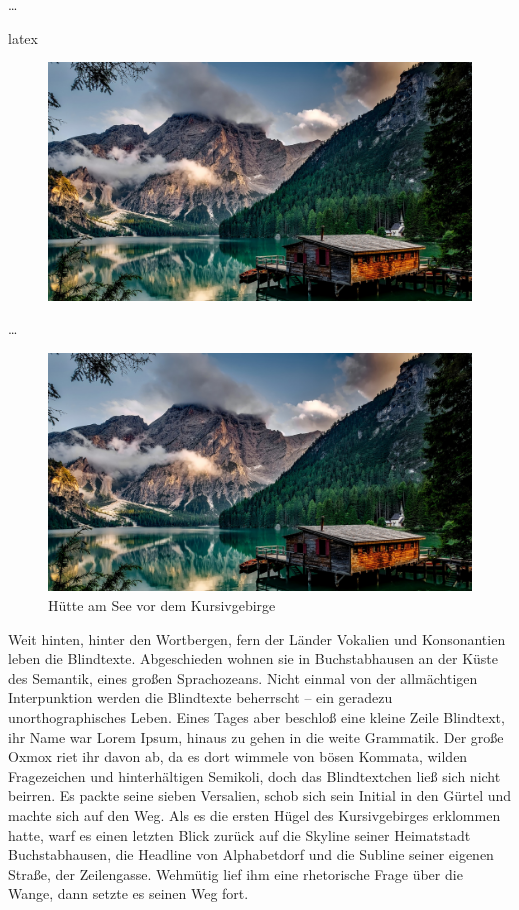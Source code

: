\begin{showcase}
    …
    \begin{code}{latex}
        \begin{figure}
            \centering
            \includegraphics[width=0.5\columnwidth]{assets/images/bilder/pexels-pixabay-147411.jpg}
        \end{figure}
    \end{code}
    …
    \tcblower
    \begin{figure}
        \centering
        \includegraphics[width=0.5\columnwidth]{assets/images/bilder/pexels-pixabay-147411.jpg}
        \caption{Hütte am See vor dem Kursivgebirge}
    \end{figure}
    Weit hinten, hinter den Wortbergen, fern der Länder Vokalien und Konsonantien leben die Blindtexte. Abgeschieden wohnen sie in Buchstabhausen an der Küste des Semantik, eines großen Sprachozeans. Nicht einmal von der allmächtigen Interpunktion werden die Blindtexte beherrscht – ein geradezu unorthographisches Leben. Eines Tages aber beschloß eine kleine Zeile Blindtext, ihr Name war Lorem Ipsum, hinaus zu gehen in die weite Grammatik. Der große Oxmox riet ihr davon ab, da es dort wimmele von bösen Kommata, wilden Fragezeichen und hinterhältigen Semikoli, doch das Blindtextchen ließ sich nicht beirren. Es packte seine sieben Versalien, schob sich sein Initial in den Gürtel und machte sich auf den Weg. Als es die ersten Hügel des Kursivgebirges erklommen hatte, warf es einen letzten Blick zurück auf die Skyline seiner Heimatstadt Buchstabhausen, die Headline von Alphabetdorf und die Subline seiner eigenen Straße, der Zeilengasse. Wehmütig lief ihm eine rhetorische Frage über die Wange, dann setzte es seinen Weg fort.
\end{showcase}